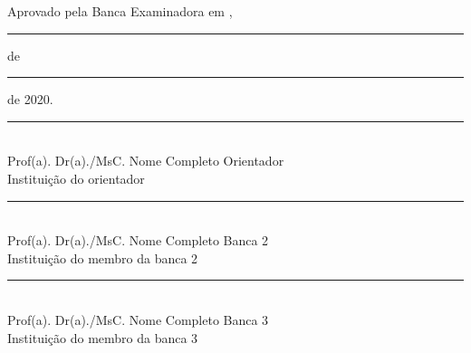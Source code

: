 
\thispagestyle{empty}
\clearpage
\begin{center}
   	
   	\ABNTEXchapterfont\large{\imprimirautor}
   	\vspace{1cm}
   	
    \ABNTEXchapterfont\bfseries\large\imprimirtitulo\ifdef{\osubtitulo}{}{}
                           
    \ifdef{\osubtitulo}{\ABNTEXchapterfont\normalsize\imprimirsubtitulo}{}
   	\vspace{0.5cm}
   	   	
   	\hspace{.4\textwidth}
   	\begin{minipage}{.5\textwidth}
   		\SingleSpacing
   		\mdseries \normalsize\imprimirpreambulo
   	 
   	\end{minipage}
   	
   	\vspace{1cm}
   	\SingleSpacing \mdseries \normalsize Aprovado pela Banca Examinadora em {\imprimirlocal},  \rule{1cm}{0.2pt} \hspace{0.01cm} de  \rule{5cm}{0.2pt} \hspace{0.01cm} de 2020.
    
    \vspace{1cm}
    \rule{10cm}{0.2pt}
    {\\Prof(a). Dr(a)./MsC. Nome Completo Orientador \\}
    {\footnotesize{Instituição do orientador}}
    
    \vspace{0.75cm}
     \rule{10cm}{0.2pt}
    {\\Prof(a). Dr(a)./MsC. Nome Completo Banca 2 \\}
    {\footnotesize{Instituição do membro da banca 2 }}
    
    \vspace{0.75cm}
     \rule{10cm}{0.2pt}
    {\\Prof(a). Dr(a)./MsC. Nome Completo Banca 3 \\}
    {\footnotesize{Instituição do membro da banca 3 }}
    
\end{center}